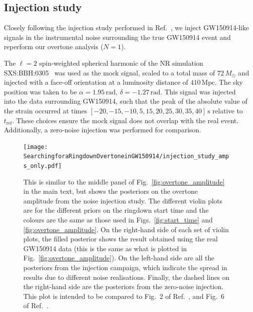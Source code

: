 \subsection{Injection study}\label{app:inj}

Closely following the injection study performed in Ref.~\cite{Cotesta:2022pci}, we inject GW150914-like signals in the instrumental noise surrounding the true GW150914 event and reperform our overtone analysis ($N=1$).

The $\ell=2$ spin-weighted spherical harmonic of the NR simulation SXS:BBH:0305~\cite{Lovelace:2016uwp} was used as the mock signal, scaled to a total mass of $72\,M_\odot$ and injected with a face-off orientation at a luminosity distance of $410\,\mathrm{Mpc}$. 
The sky position was taken to be $\alpha = 1.95\,\mathrm{rad}$, $\delta=-1.27\,\mathrm{rad}$.
This signal was injected into the data surrounding GW150914, such that the peak of the absolute value of the strain occurred at times $[-20, -15, -10, 5, 15, 20, 25, 30, 35, 40]\,\mathrm{s}$ relative to $t_\mathrm{ref}$.
These choices ensure the mock signal does not overlap with the real event.
Additionally, a zero-noise injection was performed for comparison. 

\begin{figure}[t]
    \centering
    \texttt{[image: SearchingforaRingdownOvertoneinGW150914/injection\_study\_amps\_only.pdf]}
    \caption[Posteriors on the overtone amplitude from a GW150914-like injection study]{ 
    This is similar to the middle panel of Fig.~\ref{fig:overtone_amplitude} in the main text, but shows the posteriors on the overtone amplitude from the noise injection study.
    The different violin plots are for the different priors on the ringdown start time and the colours are the same as those used in Figs.~\ref{fig:start_time} and \ref{fig:overtone_amplitude}.
    On the right-hand side of each set of violin plots, the filled posterior shows the result obtained using the real GW150914 data (this is the same as what is plotted in Fig.~\ref{fig:overtone_amplitude}). 
    On the left-hand side are all the posteriors from the injection campaign, which indicate the spread in results due to different noise realisations.  
    Finally, the dashed lines on the right-hand side are the posteriors from the zero-noise injection.
    This plot is intended to be compared to Fig.~2 of Ref.~\cite{Cotesta:2022pci}, and Fig.~6 of Ref.~\cite{Isi:2022mhy}.
    }
    \label{fig:injection_study}
\end{figure}

